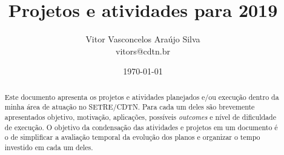 \documentclass[12pt]{report} %
\begin{document}
\title{Projetos e atividades para 2019}
\author{Vitor Vasconcelos Araújo Silva\\ vitors@cdtn.br}
\date{\today}

\maketitle %


\tableofcontents %

\begin{abstract}
Este documento apresenta os projetos e atividades planejados e/ou execução 
dentro da minha área de atuação no SETRE/CDTN. Para cada um deles são 
brevemente apresentados objetivo, motivação, aplicações, possíveis \textit{outcomes} e nível de dificuldade de execução. O objetivo da 
condensação das atividades e projetos em um documento é o de simplificar 
a avaliação temporal da evolução dos planos e organizar o tempo investido 
em cada um deles.
\end{abstract}










\end{document}
